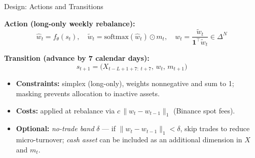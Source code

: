 \documentclass[aspectratio=169]{beamer}
\begin{document}
\begin{frame}{Design: Actions and Transitions}
\small

\textbf{Action (long-only weekly rebalance):}
\[
  \hat w_t = f_\theta(s_t),\quad
  \tilde w_t = \mathrm{softmax}(\hat w_t)\odot m_t,\quad
  w_t = \frac{\tilde w_t}{\mathbf{1}^\top \tilde w_t}\in\Delta^N
\]

\textbf{Transition (advance by 7 calendar days):}
\[
  s_{t+1}=\big(X_{t-L+1+7:\;t+7},\,w_t,\,m_{t+1}\big)
\]

\begin{itemize}\setlength{\itemsep}{3pt}
  \item \textbf{Constraints:} simplex (long-only), weights nonnegative and sum to 1; masking prevents allocation to inactive assets.
  \item \textbf{Costs:} applied at rebalance via $c\,\lVert w_t-w_{t-1}\rVert_1$ (Binance spot fees).
  \item \textbf{Optional:} \emph{no-trade band} $\delta$ — if $\lVert w_t-w_{t-1}\rVert_1<\delta$, skip trades to reduce micro-turnover; \emph{cash asset} can be included as an additional dimension in $X$ and $m_t$.
\end{itemize}

\end{frame}
\end{document}
